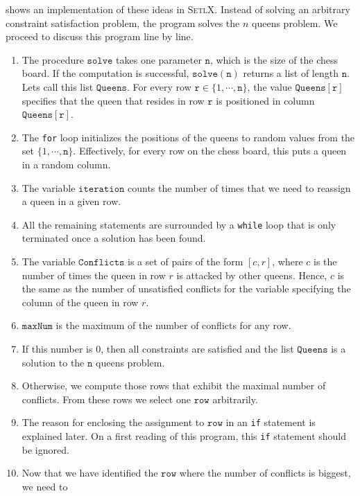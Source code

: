 \noindent
{} shows an implementation of these ideas in \textsc{SetlX}.  Instead of solving an
arbitrary constraint satisfaction problem, the program solves the $n$ queens problem.  We proceed to discuss
this program line by line.
\begin{enumerate}
\item The procedure $\mathtt{solve}$ takes one parameter $\mathtt{n}$, which is the size of the chess board.  If
      the computation is successful, $\mathtt{solve(n)}$ returns a list of length $\mathtt{n}$.  Lets call this
      list $\mathtt{Queens}$. For every row $\mathtt{r} \in \{1, \cdots, \mathtt{n}\}$, the value $\mathtt{Queens[r]}$ specifies that the queen 
      that resides in row $\mathtt{r}$ is positioned in column $\mathtt{Queens[r]}$.
\item The \texttt{for} loop initializes the positions of the queens to random values from the set
      $\{1, \cdots, \mathtt{n}\}$.  Effectively, for every row on the chess board, this puts a queen in a
      random column.
\item The variable $\mathtt{iteration}$ counts the number of times that we need to reassign a queen in a given row.
\item All the remaining statements are surrounded by a \texttt{while} loop that is only terminated once a
      solution has been found.
\item The variable $\mathtt{Conflicts}$ is a set of pairs of the form $[c, r]$, where $c$ is the number of
      times the queen in row $r$ is attacked by other queens.  Hence, $c$ is the same as the number of
      unsatisfied conflicts for the variable specifying the column of the queen in row $r$.
\item $\mathtt{maxNum}$ is the maximum of the number of conflicts for any row.
\item If this number is $0$, then all constraints are satisfied and the list $\mathtt{Queens}$ is a solution to the
      $\mathtt{n}$ queens problem.
\item Otherwise, we compute those rows that exhibit the maximal number of conflicts.  From these rows
      we select one $\mathtt{row}$ arbitrarily.
\item The reason for enclosing the assignment to $\mathtt{row}$ in an \texttt{if} statement is explained later. 
      On a first reading of  this program,  this \texttt{if} statement should be ignored.
\item Now that we have identified the $\mathtt{row}$ where the number of conflicts is biggest, we need to

\end{enumerate}
